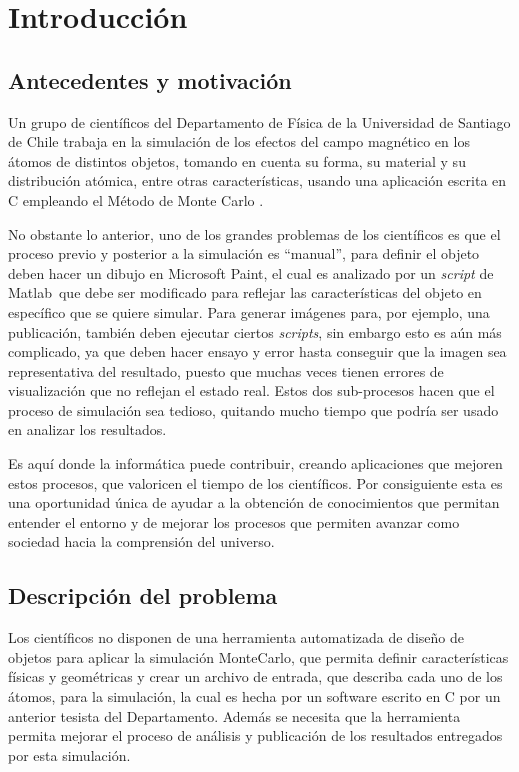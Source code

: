 \chapter{Introducci\'on}
\label{cap:intro}

\section{Antecedentes y motivaci\'on}
\label{intro:motivacion}

Un grupo de científicos del Departamento de Física de la Universidad de Santiago de Chile trabaja en la simulación de los efectos del campo magnético en los átomos de distintos objetos, tomando en cuenta su forma, su material y su distribución atómica, entre otras características, usando una aplicación escrita en C empleando el Método de Monte Carlo \citep{MonteCarlo}.

No obstante lo anterior, uno de los grandes problemas de los científicos es que el proceso previo y posterior a la simulación es ``manual'', para definir el objeto deben hacer un dibujo en Microsoft Paint\textregistered, el cual es analizado por un \emph{script} de Matlab\textregistered\ que debe ser modificado para reflejar las características del objeto en específico que se quiere simular. Para generar imágenes para, por ejemplo, una publicación, también deben ejecutar ciertos \emph{scripts}, sin embargo esto es aún más complicado, ya que deben hacer ensayo y error hasta conseguir que la imagen sea representativa del resultado, puesto que muchas veces tienen errores de visualización que no reflejan el estado real. Estos dos sub-procesos hacen que el proceso de simulación sea tedioso, quitando mucho tiempo que podría ser usado en analizar los resultados.

Es aquí donde la informática puede contribuir, creando aplicaciones que mejoren estos procesos, que valoricen el tiempo de los científicos. Por consiguiente esta es una oportunidad única de ayudar a la obtención de conocimientos que permitan entender el entorno y de mejorar los procesos que permiten avanzar como sociedad hacia la comprensión del universo.


\section{Descripci\'on del problema}
\label{intro:problema}

Los científicos no disponen de una herramienta automatizada de diseño de objetos para aplicar la simulación MonteCarlo, que permita definir características físicas y geométricas y crear un archivo de entrada, que describa cada uno de los átomos, para la simulación, la cual es hecha por un software escrito en C por un anterior tesista del Departamento. Además se necesita que la herramienta permita mejorar el proceso de análisis y publicación de los resultados entregados por esta simulación.

